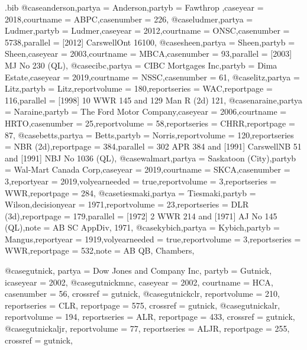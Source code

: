 \begin{filecontents*}[overwrite]{\jobname.bib}
@case{anderson,partya = {Anderson},partyb = {Fawthrop },caseyear = {2018},courtname = {ABPC},casenumber = {226},}
@case{ludmer,partya = {Ludmer},partyb = {Ludmer},caseyear = {2012},courtname = {ONSC},casenumber = {5738},parallel = {[2012] CarswellOnt 16100},}
@case{sheen,partya = {Sheen},partyb = {Sheen},caseyear = {2003},courtname = {MBCA},casenumber = {93},parallel = {[2003] MJ No 230 (QL)},}
@case{cibc,partya = {CIBC Mortgages Inc},partyb = {Dima Estate},caseyear = {2019},courtname = {NSSC},casenumber = {61},}
@case{litz,partya = {Litz},partyb = {Litz},reportvolume = {180},reportseries = {WAC},reportpage = {116},parallel = {[1998] 10 WWR 145 and 129 Man R (2d) 121},}
@case{naraine,partya = {Naraine},partyb = {The Ford Motor Company},caseyear = {2006},courtname = {HRTO},casenumber = {25},reportvolume = {58},reportseries = {CHRR},reportpage = {87},}
@case{betts,partya = {Betts},partyb = {Norris},reportvolume = {120},reportseries = {NBR (2d)},reportpage = {384},parallel = {302 APR 384 and [1991] CarswellNB 51 and [1991] NBJ No 1036 (QL)},}
@case{walmart,partya = {Saskatoon (City)},partyb = {Wal-Mart Canada Corp},caseyear = {2019},courtname = {SKCA},casenumber = {3},reportyear = {2019},volyearneeded = {true},reportvolume = {3},reportseries = {WWR},reportpage = {284},}
@case{tiesmaki,partya = {Tiesmaki},partyb = {Wilson},decisionyear = {1971},reportvolume = {23},reportseries = {DLR (3d)},reportpage = {179},parallel = {[1972] 2 WWR 214 and [1971] AJ No 145 (QL)},note = {AB SC AppDiv, 1971},}
@case{kybich,partya = {Kybich},partyb = {Mangus},reportyear = {1919},volyearneeded = {true},reportvolume = {3},reportseries = {WWR},reportpage = {532},note = {AB QB, Chambers},}








@case{gutnick,
  partya = {Dow Jones and Company Inc}, 
  partyb = {Gutnick},
  icaseyear = {2002},
  }
@case{gutnickmnc,
  caseyear = {2002},
  courtname = {HCA},
  casenumber = {56},
  crossref = {gutnick},
  }
@case{gutnickclr,
  reportvolume = {210},
  reportseries = {CLR},
  reportpage = {575},
  crossref = {gutnick},
  	}
@case{gutnickalr,
  reportvolume = {194},
  reportseries = {ALR},
  reportpage = {433},
  crossref = {gutnick},
  	}
@case{gutnickaljr,
  reportvolume = {77},
  reportseries = {ALJR},
  reportpage = {255},
  crossref = {gutnick},
  	}





\end{filecontents*}
